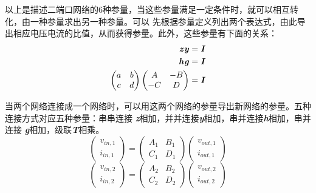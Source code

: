     \par 以上是描述二端口网络的6种参量，当这些参量满足一定条件时，就可以相互转化，由一种参量求出另一种参量。可以
    先根据参量定义列出两个表达式，由此导出相应电压电流的比值，从而获得参量。此外，这些参量有下面的关系：
    \begin{align*}
        \textbf{\textit{z}}\textbf{\textit{y}}=\textbf{\textit{I}}\\
        \textbf{\textit{h}}\textbf{\textit{g}}=\textbf{\textit{I}}\\
        \begin{pmatrix}
            a & b \\ c & d \\
        \end{pmatrix}
        \begin{pmatrix}
            A & -B \\ -C & D \\
        \end{pmatrix}
        =\textbf{\textit{I}}\\
    \end{align*}
    \par 当两个网络连接成一个网络时，可以用这两个网络的参量导出新网络的参量。五种连接方式对应五种参量：串串连接
    \textbf{\textit{z}}相加，并并连接\textbf{\textit{y}}相加，串并连接\textbf{\textit{h}}相加，串并连接
    \textit{\textbf{g}}相加，级联\textbf{\textit{T}}相乘。
    $$
        \begin{pmatrix}
            v_{in,1} \\ i_{in,1}
        \end{pmatrix}
        =
        \begin{pmatrix}
            A_1 & B_1 \\ C_1 & D_1
        \end{pmatrix}
        \begin{pmatrix}
            v_{out,1} \\ i_{out,1}
        \end{pmatrix}
    $$
    \[
        \begin{pmatrix}
            v_{in,2} \\ i_{in,2}
        \end{pmatrix}
        =
        \begin{pmatrix}
            A_2 & B_2 \\ C_2 & D_2
        \end{pmatrix}
        \begin{pmatrix}
            v_{out,2} \\ i_{out,2}
        \end{pmatrix}
    \]
